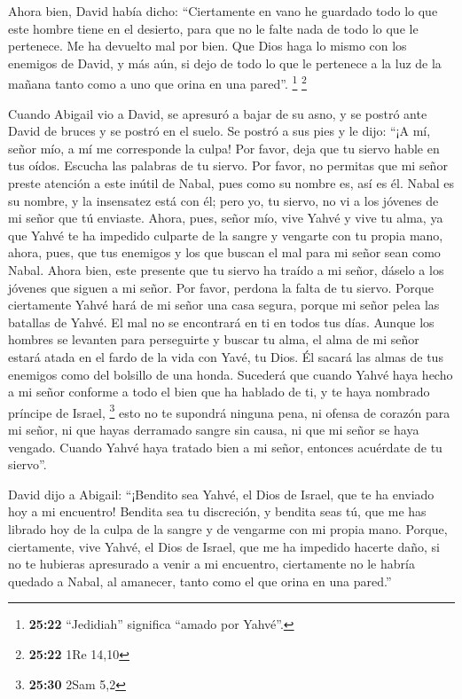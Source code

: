 \begin{paracol}{2}
 Ahora bien, David había dicho: ``Ciertamente en vano he
guardado todo lo que este hombre tiene en el desierto, para que no le
falte nada de todo lo que le pertenece. Me ha devuelto mal por bien.
 Que Dios haga lo mismo con los enemigos de David, y más
aún, si dejo de todo lo que le pertenece a la luz de la mañana tanto
como a uno que orina en una pared''. \footnote{\textbf{25:22}
  ``Jedidiah'' significa ``amado por Yahvé''.} \footnote{\textbf{25:22}
  1Re 14,10}

 Cuando Abigail vio a David, se apresuró a bajar de su
asno, y se postró ante David de bruces y se postró en el suelo.
 Se postró a sus pies y le dijo: ``¡A mí, señor mío, a mí
me corresponde la culpa! Por favor, deja que tu siervo hable en tus
oídos. Escucha las palabras de tu siervo.  Por favor, no
permitas que mi señor preste atención a este inútil de Nabal, pues como
su nombre es, así es él. Nabal es su nombre, y la insensatez está con
él; pero yo, tu siervo, no vi a los jóvenes de mi señor que tú enviaste.
 Ahora, pues, señor mío, vive Yahvé y vive tu alma, ya
que Yahvé te ha impedido culparte de la sangre y vengarte con tu propia
mano, ahora, pues, que tus enemigos y los que buscan el mal para mi
señor sean como Nabal.  Ahora bien, este presente que tu
siervo ha traído a mi señor, dáselo a los jóvenes que siguen a mi señor.
 Por favor, perdona la falta de tu siervo. Porque
ciertamente Yahvé hará de mi señor una casa segura, porque mi señor
pelea las batallas de Yahvé. El mal no se encontrará en ti en todos tus
días.  Aunque los hombres se levanten para perseguirte y
buscar tu alma, el alma de mi señor estará atada en el fardo de la vida
con Yavé, tu Dios. Él sacará las almas de tus enemigos como del bolsillo
de una honda.  Sucederá que cuando Yahvé haya hecho a mi
señor conforme a todo el bien que ha hablado de ti, y te haya nombrado
príncipe de Israel, \footnote{\textbf{25:30} 2Sam 5,2} 
esto no te supondrá ninguna pena, ni ofensa de corazón para mi señor, ni
que hayas derramado sangre sin causa, ni que mi señor se haya vengado.
Cuando Yahvé haya tratado bien a mi señor, entonces acuérdate de tu
siervo''.

 David dijo a Abigail: ``¡Bendito sea Yahvé, el Dios de
Israel, que te ha enviado hoy a mi encuentro!  Bendita
sea tu discreción, y bendita seas tú, que me has librado hoy de la culpa
de la sangre y de vengarme con mi propia mano.  Porque,
ciertamente, vive Yahvé, el Dios de Israel, que me ha impedido hacerte
daño, si no te hubieras apresurado a venir a mi encuentro, ciertamente
no le habría quedado a Nabal, al amanecer, tanto como el que orina en
una pared.''


\end{paracol}
